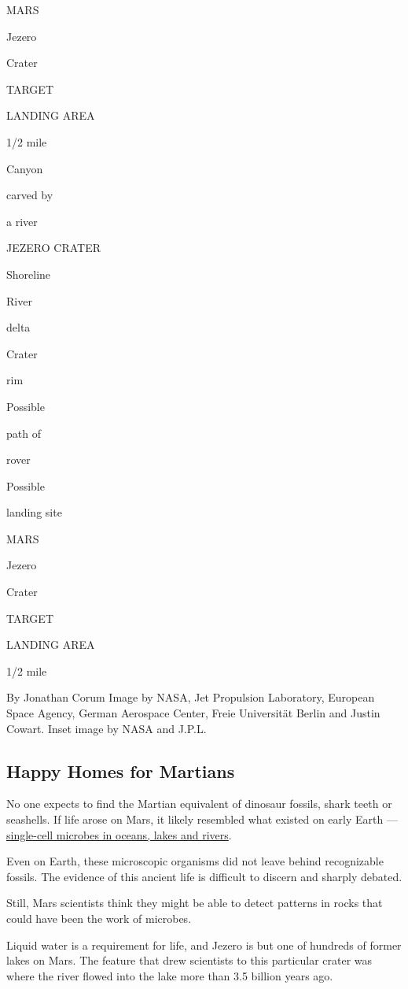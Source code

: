 MARS

Jezero

Crater

TARGET

LANDING AREA

1/2 mile

Canyon

carved by

a river

JEZERO CRATER

Shoreline

River

delta

Crater

rim

Possible

path of

rover

Possible

landing site

MARS

Jezero

Crater

TARGET

LANDING AREA

1/2 mile

By Jonathan Corum \textbar{} Image by NASA, Jet Propulsion Laboratory,
European Space Agency, German Aerospace Center, Freie Universität Berlin
and Justin Cowart. Inset image by NASA and J.P.L.

\hypertarget{happy-homes-for-martians}{%
\subsection{Happy Homes for Martians}\label{happy-homes-for-martians}}

No one expects to find the Martian equivalent of dinosaur fossils, shark
teeth or seashells. If life arose on Mars, it likely resembled what
existed on early Earth ---
\href{https://www.nytimes.com/2020/07/24/science/mars-life-water.html}{single-cell
microbes in oceans, lakes and rivers}.

Even on Earth, these microscopic organisms did not leave behind
recognizable fossils. The evidence of this ancient life is difficult to
discern and sharply debated.

Still, Mars scientists think they might be able to detect patterns in
rocks that could have been the work of microbes.

Liquid water is a requirement for life, and Jezero is but one of
hundreds of former lakes on Mars. The feature that drew scientists to
this particular crater was where the river flowed into the lake more
than 3.5 billion years ago.

